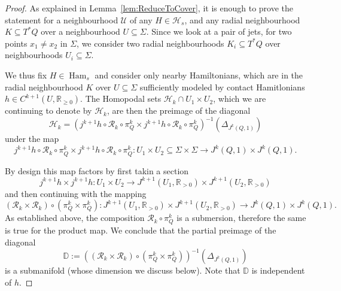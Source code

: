 \documentclass{amsart}
\newcommand{\Hcal}{{\mathcal{H}}}
\newcommand{\Rcal}{{\mathcal{R}}}
\newcommand{\Ucal}{{\mathcal{U}}}
\newcommand{\DD}{\mathbb{D}}
\newcommand{\RR}{\mathbb{R}}
\newcommand{\Ham}{\operatorname{Ham}}
\theoremstyle{definition}
\theoremstyle{remark}
\numberwithin{equation}{section}
\begin{document}
\begin{proof}
As explained in Lemma~\ref{lem:ReduceToCover}, it is enough to prove the statement for a neighbourhood $\Ucal$ of any  $H\in\Hcal_s$, and any radial neighbourhood $K\subseteq T^*Q$ over a neighbourhood $U\subseteq \Sigma$. Since we look at a pair of jets, for two points $x_1\neq x_2$ in $\Sigma$, we consider two radial neighbourhoods $K_i\subseteq T^*Q$ over neighbourhoods $U_i\subseteq \Sigma$. 

We thus fix $H\in\Ham_s$ and consider only nearby Hamiltonians, which are in the radial neighbourhood $K$ over $U\subseteq \Sigma$ sufficiently modeled by contact Hamitlonians $h\in C^{k+1}(U,\RR_{\geq 0})$. The Homopodal sets $\Hcal_k\cap U_1\times U_2$, which we are continuing to denote by $\Hcal_k$, are then the preimage of the diagonal
$$\Hcal_k=(j^{k+1}h\circ\Rcal_k\circ\pi^k_Q\times j^{k+1}h\circ\Rcal_k\circ\pi^k_Q)^{-1}(\Delta_{J^k(Q,1)})$$
under the map 
$$j^{k+1}h\circ\Rcal_k\circ\pi^k_Q\times j^{k+1}h\circ\Rcal_k\circ\pi^k_Q: U_1\times U_2\subseteq \Sigma\times\Sigma\to J^k(Q,1)\times J^k(Q,1).$$

By design this map factors by first takin a section $$j^{k+1}h\times j^{k+1}h:U_1\times U_2 \to J^{k+1}(U_1,\RR_{>0})\times J^{k+1}(U_2,\RR_{>0})$$
and then continuing with the mapping $$(\Rcal_k\times\Rcal_k)\circ(\pi_Q^k\times\pi_Q^k):J^{k+1}(U_1,\RR_{>0})\times J^{k+1}(U_2,\RR_{>0})\to J^k(Q,1)\times J^k(Q,1).$$
As established above, the composition $\Rcal_k\circ \pi_Q^k$ is a submersion, therefore the same is true for the product map. We conclude that the partial preimage of the diagonal 
$$\DD:=\left((\Rcal_k\times\Rcal_k)\circ(\pi_Q^k\times\pi_Q^k)\right)^{-1}(\Delta_{J^k(Q,1)})$$
is a submanifold (whose dimension we discuss below). Note that $\DD$ is independent of $h$.


\end{proof}
\end{document}

